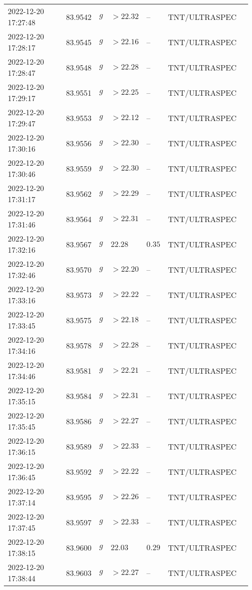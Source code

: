 \documentclass{nature_plusfigure}
\begin{document}
\begin{supplement}
\begin{center}
\begin{longtable}{lllllll}
2022-12-20 17:27:48 & 83.9542 & $g$ & $>22.32$ & -- & TNT/ULTRASPEC &  \\ 
2022-12-20 17:28:17 & 83.9545 & $g$ & $>22.16$ & -- & TNT/ULTRASPEC &  \\ 
2022-12-20 17:28:47 & 83.9548 & $g$ & $>22.28$ & -- & TNT/ULTRASPEC &  \\ 
2022-12-20 17:29:17 & 83.9551 & $g$ & $>22.25$ & -- & TNT/ULTRASPEC &  \\ 
2022-12-20 17:29:47 & 83.9553 & $g$ & $>22.12$ & -- & TNT/ULTRASPEC &  \\ 
2022-12-20 17:30:16 & 83.9556 & $g$ & $>22.30$ & -- & TNT/ULTRASPEC &  \\ 
2022-12-20 17:30:46 & 83.9559 & $g$ & $>22.30$ & -- & TNT/ULTRASPEC &  \\ 
2022-12-20 17:31:17 & 83.9562 & $g$ & $>22.29$ & -- & TNT/ULTRASPEC &  \\ 
2022-12-20 17:31:46 & 83.9564 & $g$ & $>22.31$ & -- & TNT/ULTRASPEC &  \\ 
2022-12-20 17:32:16 & 83.9567 & $g$ & $22.28$ & $0.35$ & TNT/ULTRASPEC &  \\ 
2022-12-20 17:32:46 & 83.9570 & $g$ & $>22.20$ & -- & TNT/ULTRASPEC &  \\ 
2022-12-20 17:33:16 & 83.9573 & $g$ & $>22.22$ & -- & TNT/ULTRASPEC &  \\ 
2022-12-20 17:33:45 & 83.9575 & $g$ & $>22.18$ & -- & TNT/ULTRASPEC &  \\ 
2022-12-20 17:34:16 & 83.9578 & $g$ & $>22.28$ & -- & TNT/ULTRASPEC &  \\ 
2022-12-20 17:34:46 & 83.9581 & $g$ & $>22.21$ & -- & TNT/ULTRASPEC &  \\ 
2022-12-20 17:35:15 & 83.9584 & $g$ & $>22.31$ & -- & TNT/ULTRASPEC &  \\ 
2022-12-20 17:35:45 & 83.9586 & $g$ & $>22.27$ & -- & TNT/ULTRASPEC &  \\ 
2022-12-20 17:36:15 & 83.9589 & $g$ & $>22.33$ & -- & TNT/ULTRASPEC &  \\ 
2022-12-20 17:36:45 & 83.9592 & $g$ & $>22.22$ & -- & TNT/ULTRASPEC &  \\ 
2022-12-20 17:37:14 & 83.9595 & $g$ & $>22.26$ & -- & TNT/ULTRASPEC &  \\ 
2022-12-20 17:37:45 & 83.9597 & $g$ & $>22.33$ & -- & TNT/ULTRASPEC &  \\ 
2022-12-20 17:38:15 & 83.9600 & $g$ & $22.03$ & $0.29$ & TNT/ULTRASPEC &  \\ 
2022-12-20 17:38:44 & 83.9603 & $g$ & $>22.27$ & -- & TNT/ULTRASPEC &  \\ 

\end{longtable}
\end{center}
\end{supplement}
\end{document}

